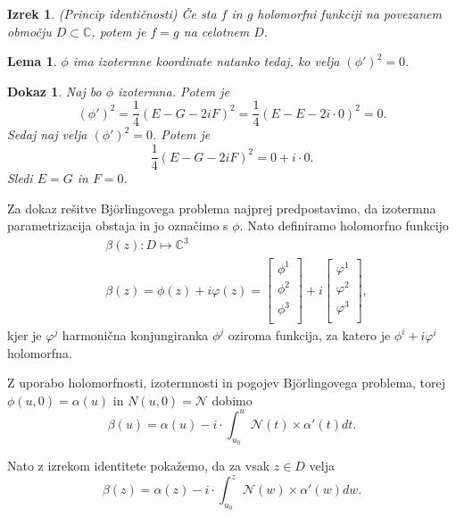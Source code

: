 \documentclass{article}
\newtheorem{lema}{Lema}
\newtheorem{dokaz}{Dokaz}
\newtheorem{izrek}{Izrek}
\begin{document}
    \begin{izrek}{(Princip identičnosti)}
        Če sta $f$ in $g$ holomorfni funkciji na povezanem območju $D \subset \mathbb{C}$, potem je $f = g$ na celotnem $D$.
    \end{izrek}

    \begin{lema}
        $\phi$ ima izotermne koordinate natanko tedaj, ko velja $(\phi')^2 = 0$.
    \end{lema}

    \begin{dokaz}
        Naj bo $\phi$ izotermna. Potem je 
        $$(\phi')^2 = \frac{1}{4} (E - G - 2iF)^2 =  \frac{1}{4} (E - E - 2i \cdot 0)^2 = 0.$$
        Sedaj naj velja $(\phi')^2 = 0$. Potem je $$\frac{1}{4} (E - G - 2iF)^2 = 0 + i \cdot 0.$$ Sledi $E = G$ in $F = 0$. 
    \end{dokaz}        



    Za dokaz rešitve Björlingovega problema najprej predpostavimo, da izotermna parametrizacija obstaja in jo označimo 
    s $\phi$. Nato definiramo holomorfno funkcijo
    \begin{align*}
        & \beta (z) : D \mapsto \mathbb{C}^3 \\
        & \beta (z) = \phi (z) + i \varphi (z) = \left[
        \begin{matrix}
            \phi^{1} \\
            \phi^{2} \\
            \phi^{3} \\
        \end{matrix} \right]
        + i \left[
        \begin{matrix}
            \varphi^{1} \\
            \varphi^{2} \\
            \varphi^{3} \\
        \end{matrix} \right],
    \end{align*}
    kjer je $\varphi^{j}$ harmonična konjungiranka $\phi^{j}$ oziroma funkcija, za katero je $\phi^{i} + i \varphi^{i}$ holomorfna.

    Z uporabo holomorfnosti, izotermnosti in pogojev Björlingovega problema, torej $\phi(u, 0) = \alpha(u)$ in 
    $N(u, 0) = \mathcal{N}$ dobimo
    $$\beta(u) = \alpha(u) - i \cdot \int_{u_0}^{u} \mathcal{N} (t) \times \alpha'(t) dt.$$

    Nato z izrekom identitete pokažemo, da za vsak $z \in D$ velja 
    $$\beta(z) = \alpha(z) - i \cdot \int_{u_0}^{z} \mathcal{N} (w) \times \alpha'(w) dw.$$
\end{document}
